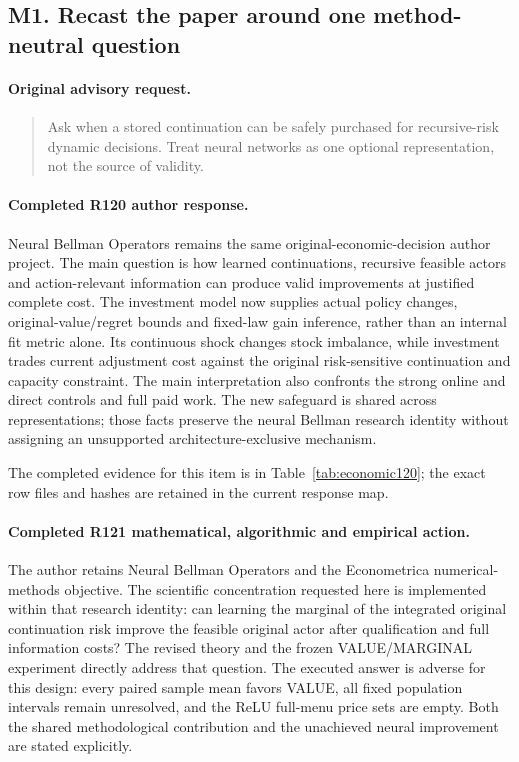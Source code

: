\subsection{M1. Recast the paper around one method-neutral question}
\label{response122:M1}

\paragraph{Original advisory request.}
\begin{quote}
Ask when a stored continuation can be safely purchased for recursive-risk dynamic decisions. Treat neural networks as one optional representation, not the source of validity.
\end{quote}

\paragraph{Completed R120 author response.}
Neural Bellman Operators remains the same original-economic-decision author project. The main question is how learned continuations, recursive feasible actors and action-relevant information can produce valid improvements at justified complete cost. The investment model now supplies actual policy changes, original-value/regret bounds and fixed-law gain inference, rather than an internal fit metric alone. Its continuous shock changes stock imbalance, while investment trades current adjustment cost against the original risk-sensitive continuation and capacity constraint. The main interpretation also confronts the strong online and direct controls and full paid work. The new safeguard is shared across representations; those facts preserve the neural Bellman research identity without assigning an unsupported architecture-exclusive mechanism.

The completed evidence for this item is in Table~\ref{tab:economic120}; the exact row files and hashes are retained in the current response map.

\paragraph{Completed R121 mathematical, algorithmic and empirical action.}
The author retains Neural Bellman Operators and the Econometrica numerical-methods objective. The scientific concentration requested here is implemented within that research identity: can learning the marginal of the integrated original continuation risk improve the feasible original actor after qualification and full information costs? The revised theory and the frozen VALUE/MARGINAL experiment directly address that question. The executed answer is adverse for this design: every paired sample mean favors VALUE, all fixed population intervals remain unresolved, and the ReLU full-menu price sets are empty. Both the shared methodological contribution and the unachieved neural improvement are stated explicitly.

